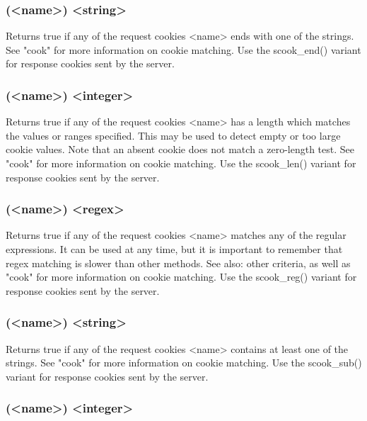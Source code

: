 \subsubsection[cook\_end]{(<name>) <string>}

  Returns true if any of the request cookies <name> ends with one of the
  strings. See "cook" for more information on cookie matching. Use the
  scook\_end() variant for response cookies sent by the server.

\subsubsection[cook\_len]{(<name>) <integer>}

  Returns true if any of the request cookies <name> has a length which matches
  the values or ranges specified. This may be used to detect empty or too large
  cookie values. Note that an absent cookie does not match a zero-length test.
  See "cook" for more information on cookie matching. Use the scook\_len()
  variant for response cookies sent by the server.

\subsubsection[cook\_reg]{(<name>) <regex>}

  Returns true if any of the request cookies <name> matches any of the regular
  expressions. It can be used at any time, but it is important to remember that
  regex matching is slower than other methods. See also: other  criteria,
  as well as "cook" for more information on cookie matching. Use the
  scook\_reg() variant for response cookies sent by the server.

\subsubsection[cook\_sub]{(<name>) <string>}

  Returns true if any of the request cookies <name> contains at least one of
  the strings. See "cook" for more information on cookie matching. Use the
  scook\_sub() variant for response cookies sent by the server.

\subsubsection[cook\_val]{(<name>) <integer>}


